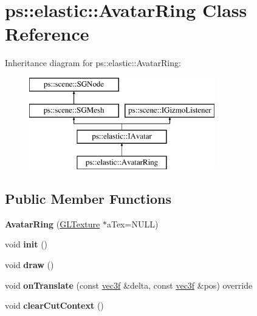 \hypertarget{classps_1_1elastic_1_1AvatarRing}{}\section{ps\+:\+:elastic\+:\+:Avatar\+Ring Class Reference}
\label{classps_1_1elastic_1_1AvatarRing}
Inheritance diagram for ps\+:\+:elastic\+:\+:Avatar\+Ring\+:\begin{figure}[H]
\begin{center}
\leavevmode
\includegraphics[height=4.000000cm]{classps_1_1elastic_1_1AvatarRing}
\end{center}
\end{figure}
\subsection*{Public Member Functions}
\begin{DoxyCompactItemize}
\item 
\hypertarget{classps_1_1elastic_1_1AvatarRing_ae7df8a8e69f621bab70d99aaa8c91403}{}{\bfseries Avatar\+Ring} (\hyperlink{classps_1_1opengl_1_1GLTexture}{G\+L\+Texture} $\ast$a\+Tex=N\+U\+L\+L)\label{classps_1_1elastic_1_1AvatarRing_ae7df8a8e69f621bab70d99aaa8c91403}

\item 
\hypertarget{classps_1_1elastic_1_1AvatarRing_a440d1593d71051c714e7c1ec63083027}{}void {\bfseries init} ()\label{classps_1_1elastic_1_1AvatarRing_a440d1593d71051c714e7c1ec63083027}

\item 
\hypertarget{classps_1_1elastic_1_1AvatarRing_a4cf7d4c4d18534929b9de180eae4ed1c}{}void {\bfseries draw} ()\label{classps_1_1elastic_1_1AvatarRing_a4cf7d4c4d18534929b9de180eae4ed1c}

\item 
\hypertarget{classps_1_1elastic_1_1AvatarRing_aa0e630ffc0c4b2c9b3195700953df4cf}{}void {\bfseries on\+Translate} (const \hyperlink{classps_1_1base_1_1Vec3}{vec3f} \&delta, const \hyperlink{classps_1_1base_1_1Vec3}{vec3f} \&pos) override\label{classps_1_1elastic_1_1AvatarRing_aa0e630ffc0c4b2c9b3195700953df4cf}

\item 
\hypertarget{classps_1_1elastic_1_1AvatarRing_a92f03a4a1acc9adbb062567d7c9fc285}{}void {\bfseries clear\+Cut\+Context} ()\label{classps_1_1elastic_1_1AvatarRing_a92f03a4a1acc9adbb062567d7c9fc285}

\end{DoxyCompactItemize}
